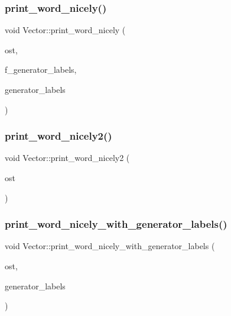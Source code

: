 \mbox{\label{class_vector_acf1a607f7a282a128ada9128465ce38f}} 
\subsubsection{\texorpdfstring{print\+\_\+word\+\_\+nicely()}{print\_word\_nicely()}}
{\footnotesize\ttfamily void Vector\+::print\+\_\+word\+\_\+nicely (\begin{DoxyParamCaption}\item[{ostream \&}]{ost,  }\item[{\mbox{\hyperlink{galois_8h_a09fddde158a3a20bd2dcadb609de11dc}{I\+NT}}}]{f\+\_\+generator\+\_\+labels,  }\item[{\mbox{\hyperlink{class_vector}{Vector}} \&}]{generator\+\_\+labels }\end{DoxyParamCaption})}

\mbox{\label{class_vector_ad8b224e83836e7b1fad7785853a4df79}} 
\subsubsection{\texorpdfstring{print\+\_\+word\+\_\+nicely2()}{print\_word\_nicely2()}}
{\footnotesize\ttfamily void Vector\+::print\+\_\+word\+\_\+nicely2 (\begin{DoxyParamCaption}\item[{ostream \&}]{ost }\end{DoxyParamCaption})}

\mbox{\label{class_vector_af999a68ef44d55c7c0e7a1eb7889fbba}} 
\subsubsection{\texorpdfstring{print\+\_\+word\+\_\+nicely\+\_\+with\+\_\+generator\+\_\+labels()}{print\_word\_nicely\_with\_generator\_labels()}}
{\footnotesize\ttfamily void Vector\+::print\+\_\+word\+\_\+nicely\+\_\+with\+\_\+generator\+\_\+labels (\begin{DoxyParamCaption}\item[{ostream \&}]{ost,  }\item[{\mbox{\hyperlink{class_vector}{Vector}} \&}]{generator\+\_\+labels }\end{DoxyParamCaption})}

